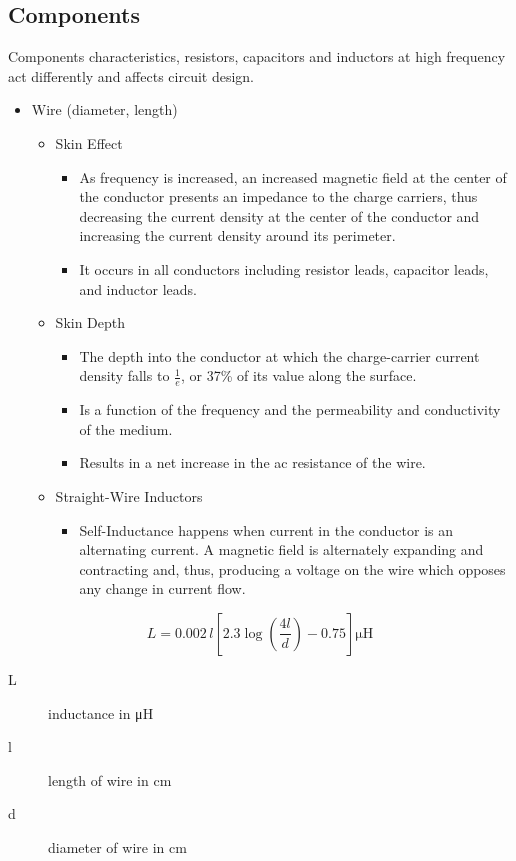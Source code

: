 \subsection{Components}
Components characteristics, resistors, capacitors and inductors at high frequency act differently and affects circuit design. 
\begin{itemize}
	\item Wire (diameter, length)
	\begin{itemize}
		\item Skin Effect
		\begin{itemize}
			\item As frequency is increased, an increased magnetic field at the center of the conductor presents an impedance to the charge carriers, thus decreasing the current density at the center of the conductor and increasing the current density around its perimeter.
			\item It occurs in all conductors including resistor leads,
			capacitor leads, and inductor leads.
		\end{itemize}
		\item Skin Depth
		\begin{itemize}
			\item The depth into the conductor at which the charge-carrier current density falls to $\frac{1}{e}$, or 37\% of its value along the surface.
			\item Is a function of the frequency and the permeability and conductivity of the medium.
			\item Results in a net increase in	the ac resistance of the wire.
		\end{itemize} 
		\item Straight-Wire Inductors
		\begin{itemize}
			\item Self-Inductance happens when current in the conductor is an alternating current. A magnetic field is alternately expanding
			and contracting and, thus, producing a voltage on the wire which
			opposes any change in current flow.
		\end{itemize}
	\end{itemize}
\end{itemize}

\begin{equation}
L = 0.002\,l\left[2.3\log\left(\dfrac{4l}{d}\right)-0.75\right] \si{\micro\henry}
\end{equation}
\begin{description}
	\item[L] inductance in \si{\micro\henry}
	\item[l] length of wire in \si{\centi\meter}
	\item[d] diameter of wire in \si{\centi\meter}
\end{description}

